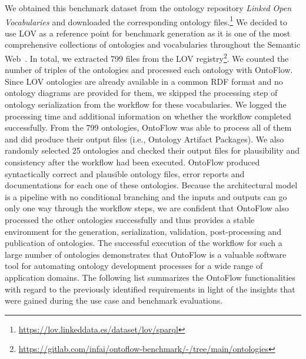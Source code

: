 \documentclass[runningheads]{llncs}
\begin{document}
We obtained this benchmark dataset from the ontology repository \textit{Linked Open Vocabularies} and downloaded the corresponding ontology files.\footnote{\url{https://lov.linkeddata.es/dataset/lov/sparql}} We decided to use LOV as a reference point for benchmark generation as it is one of the most comprehensive collections of ontologies and vocabularies throughout the Semantic Web~\cite{lov}. In total, we extracted 799 files from the LOV registry\footnote{\url{https://gitlab.com/infai/ontoflow-benchmark/-/tree/main/ontologies}}. We counted the number of triples of the ontologies and processed each ontology with OntoFlow. Since LOV ontologies are already available in a common RDF format and no ontology diagrams are provided for them, we skipped the processing step of ontology serialization from the workflow for these vocabularies. We logged the processing time and additional information on whether the workflow completed successfully. From the 799 ontologies, OntoFlow was able to process all of them and did produce their output files (i.e., Ontology Artifact Packages). We also randomly selected 25 ontologies and checked their output files for plausibility and consistency after the workflow had been executed. OntoFlow produced syntactically correct and plausible ontology files, error reports and documentations for each one of these ontologies. Because the architectural model is a pipeline with no conditional branching and the inputs and outputs can go only one way through the workflow steps, we are confident that OntoFlow also processed the other ontologies successfully and thus provides a stable environment for the generation, serialization, validation, post-processing and publication of ontologies. The successful execution of the workflow for such a large number of ontologies demonstrates that OntoFlow is a valuable software tool for automating ontology development processes for a wide range of application domains. The following list summarizes the OntoFlow functionalities with regard to the previously identified requirements in light of the insights that were gained during the use case and benchmark evaluations.
\end{document}
